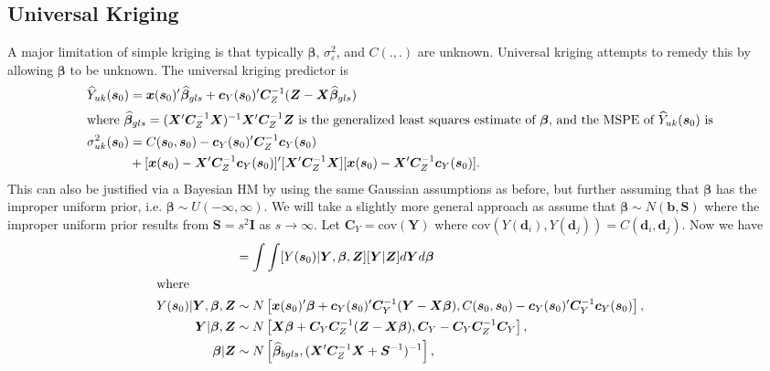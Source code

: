 \documentclass[12pt]{article}
\begin{document}
\subsection{Universal Kriging}
A major limitation of simple kriging is that typically $\bm{\beta}$, $\sigma^2_{\varepsilon}$, and $C(.,.)$ are unknown. Universal kriging attempts to remedy this by allowing $\bm{\beta}$ to be unknown. The universal kriging predictor is
\begin{align*}
\widehat{Y}_{uk}(\bm{s}_0) &= \bm{x}(\bm{s}_0)'\widehat{\bm{\beta}}_{gls} + \bm{c}_Y(\bm{s}_0)'\bm{C}_Z^{-1}(\bm{Z} - \bm{X}\widehat{\bm{\beta}}_{gls})\\
\intertext{where $\widehat{\bm{\beta}}_{gls} = (\bm{X}'\bm{C}_Z^{-1}\bm{X})^{-1}\bm{X}'\bm{C}_Z^{-1}\bm{Z}$ is the generalized least squares estimate of $\bm{\beta}$, and the MSPE of $\widehat{Y}_{uk}(\bm{s}_0)$ is}
\sigma_{uk}^2(\bm{s}_0) &= C(\bm{s}_0, \bm{s}_0) - \bm{c}_Y(\bm{s}_0)'\bm{C}_Z^{-1}\bm{c}_Y(\bm{s}_0)  \\
& + [\bm{x}(\bm{s}_0)  - \bm{X}'\bm{C}_Z^{-1}\bm{c}_Y(\bm{s}_0)]'[\bm{X}'\bm{C}_Z^{-1}\bm{X}][\bm{x}(\bm{s}_0)  - \bm{X}'\bm{C}_Z^{-1}\bm{c}_Y(\bm{s}_0)].
\end{align*}
This can also be justified via a Bayesian HM by using the same Gaussian assumptions as before, but further assuming that $\bm{\beta}$ has the improper uniform prior, i.e. $\bm{\beta} \sim U(-\infty, \infty)$. We will take a slightly more general approach as assume that $\bm{\beta}\sim N(\bm{b}, \bm{S})$ where the improper uniform prior results from $\bm{S} = s^2\bm{I}$ as $s\to\infty$. Let $\bm{C}_Y = \mathrm{cov}(\bm{Y})$ where $\mathrm{cov}(Y(\bm{d}_i),Y(\bm{d}_j)) = C(\bm{d}_i,\bm{d}_j)$. Now we have
\begin{align*}
[Y(\bm{s}_0)|\bm{Z}] &= \int \int [Y(\bm{s}_0)|\bm{Y}, \bm{\beta}, \bm{Z}][\bm{Y}|\bm{Z}]d\bm{Y}d\bm{\beta}\\
\intertext{where}
Y(\bm{s}_0)|\bm{Y},\bm{\beta}, \bm{Z} &\sim N\left[\bm{x}(\bm{s}_0)'\bm{\beta} + \bm{c}_Y(\bm{s}_0)'\bm{C}_Y^{-1}(\bm{Y} - \bm{X}\bm{\beta}), C(\bm{s}_0, \bm{s}_0) - \bm{c}_Y(\bm{s}_0)'\bm{C}_Y^{-1}\bm{c}_Y(\bm{s}_0)\right],\\
\bm{Y}|\bm{\beta},\bm{Z} &\sim N\left[\bm{X}\bm{\beta} + \bm{C}_Y\bm{C}_Z^{-1}(\bm{Z} - \bm{X}\bm{\beta}), \bm{C}_Y - \bm{C}_Y\bm{C}_Z^{-1}\bm{C}_Y\right],\\
\bm{\beta}|\bm{Z} &\sim N\left[\widehat{\bm{\beta}}_{bgls}, (\bm{X}'\bm{C}_Z^{-1}\bm{X} + \bm{S}^{-1})^{-1}\right],
\end{align*}
\end{document}
